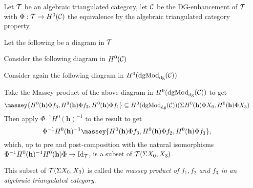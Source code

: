 \begin{definition}
    Let \( {\mathcal{T}} \) be an algebraic triangulated category, let \( {\mathcal{C}} \) be the DG-enhancement of \( {\mathcal{T}} \) with \( \Phi: {\mathcal{T}} \to H^0({\mathcal{C}}) \) the equivalence by the algebraic triangulated category property.
    
    Let the following be a diagram in \( {\mathcal{T}} \)
    \begin{center}
    \end{center}
    Consider the following diagram in \( H^0({\mathcal{C}}) \)
    \begin{center}
    \end{center}
    Consider again the following diagram in \( H^0(\operatorname{dgMod}_{\operatorname{dg}}({\mathcal{C}})) \)
    \begin{center}
    \end{center}
    Take the Massey product of the above diagram in \( H^0(\operatorname{dgMod}_{\operatorname{dg}}({\mathcal{C}})) \) to get
    \[
        \massey{H^0(\mathbf{h}) \Phi f_3, H^0(\mathbf{h}) \Phi f_2, H^0(\mathbf{h}) \Phi f_1} \subseteq H^0(\dgMod_{\dg}(\Cc))(\Sigma H^0(\mathbf{h}) \Phi X_0, H^0(\mathbf{h}) \Phi X_3)
    \]
    Then apply \( \Phi^{-1} H^0(\mathbf{h})^{-1} \) to the result to get
    \[
        \Phi^{-1} H^0(\mathbf{h})^{-1} \massey{H^0(\mathbf{h}) \Phi f_3, H^0(\mathbf{h}) \Phi f_2, H^0(\mathbf{h}) \Phi f_1},
    \]
    which, up to pre and post-composition with the natural isomorphisms \( \Phi^{-1} H^0(\mathbf{h})^{-1} H^0(\mathbf{h}) \Phi \to \operatorname{Id}_{{\mathcal{T}}} \), is a subset of \( {\mathcal{T}}(\Sigma X_0, X_3) \).

    This subset of \( {\mathcal{T}}(\Sigma X_0, X_3) \) is called the \emph{massey product of \( f_1, f_2 \) and \( f_3 \) in an algebraic triangulated category}.
\end{definition}
